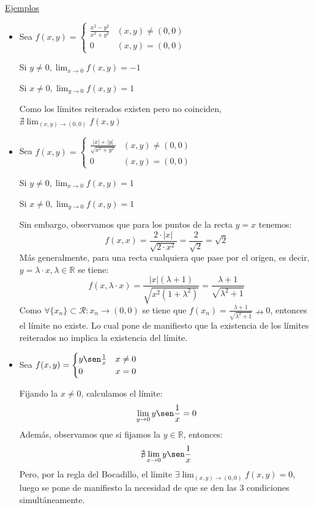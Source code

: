 \documentclass[10pt,a4paper,openright]{book}
\theoremstyle{break}
\begin{document}
\underline{Ejemplos}
\begin{itemize}
\item Sea $f(x,y) = \begin{cases} \frac{x^2 - y^2}{x^2 + y^2} & (x,y) \neq (0,0) \\ 0 & (x,y) = (0,0)\end{cases}$

Si $y \neq 0, \lim_{x \to 0} f(x,y) = -1$

Si $x \neq 0, \lim_{y \to 0} f(x,y) = 1$

Como los límites reiterados existen pero no coinciden, $\nexists \lim_{(x,y) \to (0,0)} f(x,y)$

\item Sea $f(x,y) = \begin{cases} \frac{|x| + |y|}{\sqrt{x^2 + y^2}}  & (x,y) \neq (0,0) \\ 0 & (x,y) = (0,0)\end{cases}$

Si $y \neq 0, \lim_{x \to 0} f(x,y) = 1$

Si $x \neq 0, \lim_{y \to 0} f(x,y) = 1$

Sin embargo, observamos que para los puntos de la recta $y=x$ tenemos:
$$f(x,x) = \frac{2 \cdot |x|}{\sqrt{2 \cdot x^2}} = \frac{2}{\sqrt{2}} = \sqrt{2}$$
Más generalmente, para una recta cualquiera que pase por el origen, es decir, $y = \lambda \cdot x, \lambda \in \mathbb{R}$ se tiene:
$$f(x, \lambda \cdot x) = \frac{|x|(\lambda + 1)}{\sqrt{x^2 (1 + \lambda^2)}} = \frac{\lambda + 1}{\sqrt{\lambda^2 + 1 }}$$
Como $\forall\{x_n\}\subset \mathcal{R}: x_n \rightarrow (0,0)$ se tiene que $f(x_n)=\frac{\lambda + 1}{\sqrt{\lambda^2 + 1}} \nrightarrow 0$, entonces el límite no existe. Lo cual pone de manifiesto que la existencia de los límites reiterados no implica la existencia del límite.
\item Sea $f(x,y) = \begin{cases} y \sen \frac{1}{x} & x \neq 0 \\ 0 & x = 0 \end{cases}$

Fijando la $x \neq 0$, calculamos el límite:
$$\lim_{y \to 0}  y \sen \frac{1}{x} = 0$$
Además, observamos que si fijamos la $y \in \mathbb{R}$, entonces:
$$\nexists \lim_{x \to 0}  y \sen \frac{1}{x} $$
Pero, por la regla del Bocadillo, el  límite $\exists \lim_{(x,y) \to (0,0)} f(x,y) = 0$, luego se pone de manifiesto la necesidad de que se den las 3 condiciones simultáneamente.
\end{itemize}
\end{document}
